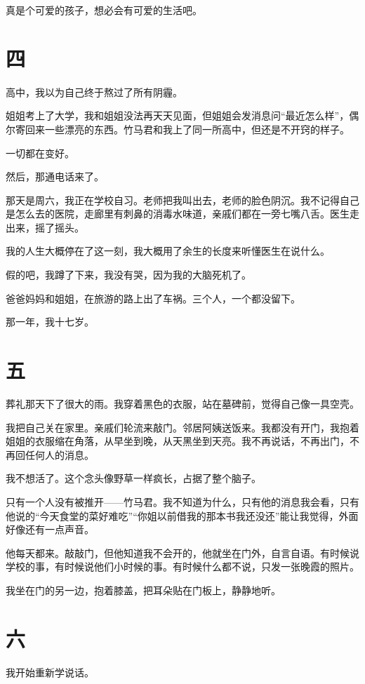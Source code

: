 \documentclass[12pt, a4paper]{ctexart}
\begin{document}
真是个可爱的孩子，想必会有可爱的生活吧。

\section*{四}

高中，我以为自己终于熬过了所有阴霾。

姐姐考上了大学，我和姐姐没法再天天见面，但姐姐会发消息问“最近怎么样”，偶尔寄回来一些漂亮的东西。竹马君和我上了同一所高中，但还是不开窍的样子。

一切都在变好。

然后，那通电话来了。

那天是周六，我正在学校自习。老师把我叫出去，老师的脸色阴沉。我不记得自己是怎么去的医院，走廊里有刺鼻的消毒水味道，亲戚们都在一旁七嘴八舌。医生走出来，摇了摇头。

我的人生大概停在了这一刻，我大概用了余生的长度来听懂医生在说什么。

假的吧，我蹲了下来，我没有哭，因为我的大脑死机了。

爸爸妈妈和姐姐，在旅游的路上出了车祸。三个人，一个都没留下。

那一年，我十七岁。

\section*{五}

葬礼那天下了很大的雨。我穿着黑色的衣服，站在墓碑前，觉得自己像一具空壳。

我把自己关在家里。亲戚们轮流来敲门。邻居阿姨送饭来。我都没有开门，我抱着姐姐的衣服缩在角落，从早坐到晚，从天黑坐到天亮。我不再说话，不再出门，不再回任何人的消息。

我不想活了。这个念头像野草一样疯长，占据了整个脑子。

只有一个人没有被推开——竹马君。我不知道为什么，只有他的消息我会看，只有他说的“今天食堂的菜好难吃”“你姐以前借我的那本书我还没还”能让我觉得，外面好像还有一点声音。

他每天都来。敲敲门，但他知道我不会开的，他就坐在门外，自言自语。有时候说学校的事，有时候说他们小时候的事。有时候什么都不说，只发一张晚霞的照片。

我坐在门的另一边，抱着膝盖，把耳朵贴在门板上，静静地听。

\section*{六}

我开始重新学说话。
\end{document}
